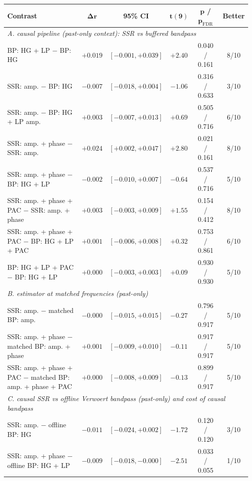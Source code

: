 \begin{tabular}{lccccc}
\toprule
\textbf{Contrast} & $\boldsymbol{\Delta r}$ & \textbf{95\% CI} & $\boldsymbol{t(9)}$ & $\boldsymbol{p}$ / $\boldsymbol{p_{\mathrm{FDR}}}$ & \textbf{Better} \\
\midrule
\multicolumn{6}{l}{\textit{A. causal pipeline (past-only context): SSR vs buffered bandpass}} \\
\quad BP: HG + LP $-$ BP: HG & $+0.019$ & $[-0.001, +0.039]$ & $+2.40$ & 0.040 / 0.161 & 8/10 \\
\quad SSR: amp. $-$ BP: HG & $-0.007$ & $[-0.018, +0.004]$ & $-1.06$ & 0.316 / 0.633 & 3/10 \\
\quad SSR: amp. $-$ BP: HG + LP amp. & $+0.003$ & $[-0.007, +0.013]$ & $+0.69$ & 0.505 / 0.716 & 6/10 \\
\quad SSR: amp. + phase $-$ SSR: amp. & $+0.024$ & $[+0.002, +0.047]$ & $+2.80$ & 0.021 / 0.161 & 8/10 \\
\quad SSR: amp. + phase $-$ BP: HG + LP & $-0.002$ & $[-0.010, +0.007]$ & $-0.64$ & 0.537 / 0.716 & 5/10 \\
\quad SSR: amp. + phase + PAC $-$ SSR: amp. + phase & $+0.003$ & $[-0.003, +0.009]$ & $+1.55$ & 0.154 / 0.412 & 8/10 \\
\quad SSR: amp. + phase + PAC $-$ BP: HG + LP + PAC & $+0.001$ & $[-0.006, +0.008]$ & $+0.32$ & 0.753 / 0.861 & 6/10 \\
\quad BP: HG + LP + PAC $-$ BP: HG + LP & $+0.000$ & $[-0.003, +0.003]$ & $+0.09$ & 0.930 / 0.930 & 5/10 \\
\multicolumn{6}{l}{\textit{B. estimator at matched frequencies (past-only)}} \\
\quad SSR: amp. $-$ matched BP: amp. & $-0.000$ & $[-0.015, +0.015]$ & $-0.27$ & 0.796 / 0.917 & 5/10 \\
\quad SSR: amp. + phase $-$ matched BP: amp. + phase & $+0.001$ & $[-0.009, +0.010]$ & $-0.11$ & 0.917 / 0.917 & 5/10 \\
\quad SSR: amp. + phase + PAC $-$ matched BP: amp. + phase + PAC & $+0.000$ & $[-0.008, +0.009]$ & $-0.13$ & 0.899 / 0.917 & 5/10 \\
\multicolumn{6}{l}{\textit{C. causal SSR vs offline Verwoert bandpass (past-only) and cost of causal bandpass}} \\
\quad SSR: amp. $-$ offline BP: HG & $-0.011$ & $[-0.024, +0.002]$ & $-1.72$ & 0.120 / 0.120 & 3/10 \\
\quad SSR: amp. + phase $-$ offline BP: HG + LP & $-0.009$ & $[-0.018, -0.000]$ & $-2.51$ & 0.033 / 0.055 & 1/10 \\

\end{tabular}

